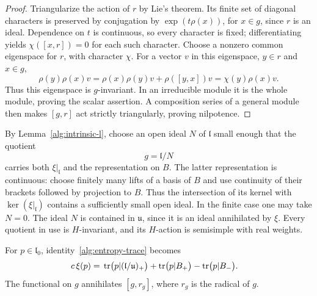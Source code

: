 \begin{proof}
Triangularize the action of $r$ by Lie's theorem. Its finite set of
diagonal characters is preserved by conjugation by
$\exp(t\rho(x))$, for $x\in g$, since $r$ is an ideal.
Dependence on $t$ is continuous, so every character is fixed;
differentiating yields $\chi([x,r])=0$ for each such character.
Choose a nonzero common eigenspace for $r$, with character $\chi$.
For a vector $v$ in this eigenspace, $y\in r$ and $x\in g$,
\[
 \rho(y)\rho(x)v
 =\rho(x)\rho(y)v+\rho([y,x])v
 =\chi(y)\rho(x)v.
\]
Thus this eigenspace is $g$-invariant. In an irreducible module it
is the whole module, proving the scalar assertion. A composition
series of a general module then makes $[g,r]$ act strictly
triangularly, proving nilpotence.
\end{proof}

By Lemma~\ref{alg:intrinsic-l}, choose an open ideal $N$ of
$\mathfrak l$ small enough that the quotient
\[
 g=\mathfrak l/N
\]
carries both $\xi|_{\mathfrak l}$ and the representation on $B$.
The latter representation is continuous: choose finitely many lifts
of a basis of $B$ and use continuity of their brackets followed by
projection to $B$. Thus the intersection of its kernel with
$\ker(\xi|_{\mathfrak l})$ contains a sufficiently small open ideal.
In the finite case one may take $N=0$. The ideal $N$ is contained
in $\mathfrak u$, since it is an ideal annihilated by $\xi$.
Every quotient in use is $H$-invariant, and its $H$-action is
semisimple with real weights.

\begin{lemma}
\label{alg:finite-trace}
For $p\in\mathfrak l_0$, identity~\eqref{alg:entropy-trace} becomes
\begin{equation}
 \begin{split}
 c\,\xi(p)
 ={}&\operatorname{tr}\bigl(p|(\mathfrak l/\mathfrak u)_+\bigr)
       +\operatorname{tr}\bigl(p|B_+\bigr)
       -\operatorname{tr}\bigl(p|B_-\bigr).
 \end{split}
 \label{alg:three-traces}
\end{equation}
The functional on $g$ annihilates $[g,r_g]$, where $r_g$ is the
radical of $g$.
\end{lemma}

